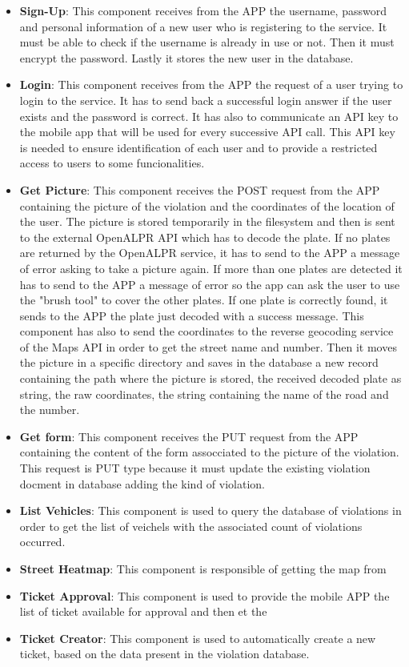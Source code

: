 \begin{itemize}
  \item \textbf{Sign-Up}: This component receives from the APP the username, password and personal information of a new user who is registering to the service. It must be able to check if the username is already in use or not. Then it must encrypt the password. Lastly it stores the new user in the database.
  \item \textbf{Login}: This component receives from the APP the request of a user trying to login to the service. It has to send back a successful login answer if the user exists and the password is correct. It has also to communicate an API key to the mobile app that will be used for every successive API call. This API key is needed to ensure identification of each user and to provide a restricted access to users to some funcionalities.
  \item \textbf{Get Picture}: This component receives the POST request from the APP containing the picture of the violation and the coordinates of the location of the user. The picture is stored temporarily in the filesystem and then is sent to the external OpenALPR API which has to decode the plate. If no plates are returned by the OpenALPR service, it has to send to the APP a message of error asking to take a picture again. If more than one plates are detected it has to send to the APP a message of error so the app can ask the user to use the "brush tool" to cover the other plates. If one plate is correctly found, it sends to the APP the plate just decoded with a success message. This component has also to send the coordinates to the reverse geocoding service of the Maps API in order to get the street name and number. Then it moves the picture in a specific directory and saves in the database a new record containing the path where the picture is stored, the received decoded plate as string, the raw coordinates, the string containing the name of the road and the number.
  \item \textbf{Get form}: This component receives the PUT request from the APP containing the content of the form assocciated to the picture of the violation. This request is PUT type because it must update the existing violation docment in database adding the kind of violation.
  \item \textbf{List Vehicles}: This component is used to query the database of violations in order to get the list of veichels with the associated count of violations occurred.
  \item \textbf{Street Heatmap}: This component is responsible of getting the map from
  \item \textbf{Ticket Approval}: This component is used to provide the mobile APP the list of ticket available for approval and then et the
  \item \textbf{Ticket Creator}: This component is used to automatically create a new ticket, based on the data present in the violation database.



\end{itemize}
